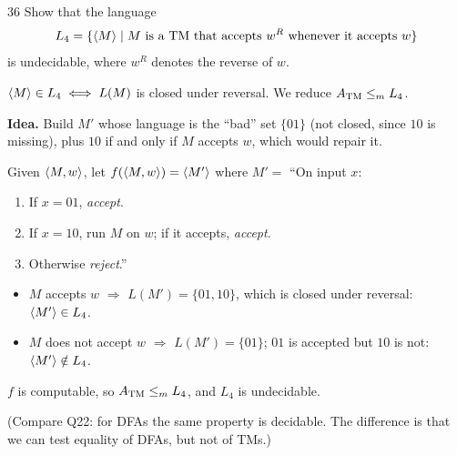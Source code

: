\begin{question}{36}
Show that the language
\[L_4=\{\langle M\rangle\mid M \text{ is a TM that accepts } w^R \text{ whenever it accepts } w\}\]
is undecidable, where $w^R$ denotes the reverse of $w$.
\end{question}
\begin{soln}
$\langle M\rangle\in L_4\iff L(M)$ is closed under reversal. We reduce $A_{\mathrm{TM}}\le_{m} L_4$.

\textbf{Idea.} Build $M'$ whose language is the ``bad'' set $\{01\}$ (not closed, since $10$ is missing), plus $10$ if and only if $M$ accepts $w$, which would repair it.

Given $\langle M,w\rangle$, let $f(\langle M,w\rangle)=\langle M'\rangle$ where
$M'=$ ``On input $x$:
\begin{enumerate}
\item If $x=01$, \emph{accept}.
\item If $x=10$, run $M$ on $w$; if it accepts, \emph{accept}.
\item Otherwise \emph{reject}.''
\end{enumerate}
\begin{itemize}
\item $M$ accepts $w$ $\Rightarrow$ $L(M')=\{01,10\}$, which is closed under reversal: $\langle M'\rangle\in L_4$.
\item $M$ does not accept $w$ $\Rightarrow$ $L(M')=\{01\}$; $01$ is accepted but $10$ is not: $\langle M'\rangle\notin L_4$.
\end{itemize}
$f$ is computable, so $A_{\mathrm{TM}}\le_{m} L_4$, and $L_4$ is undecidable.

(Compare Q22: for DFAs the same property is decidable. The difference is that we can test equality of DFAs, but not of TMs.)
\end{soln}

